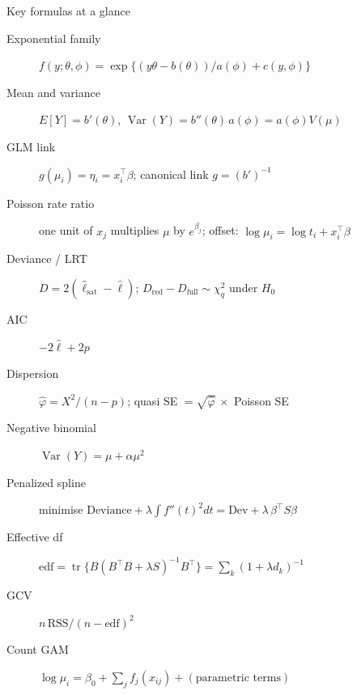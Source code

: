 \documentclass[aspectratio=169,11pt]{beamer}
\begin{document}
\begin{frame}{Key formulas at a glance}
  \footnotesize
  \begin{description}
    \item[Exponential family] $f(y;\theta,\phi) = \exp\{(y\theta - b(\theta))/a(\phi) + c(y,\phi)\}$
    \item[Mean and variance] $E[Y] = b'(\theta)$, \quad $\operatorname{Var}(Y) = b''(\theta)\,a(\phi) = a(\phi)V(\mu)$
    \item[GLM link] $g(\mu_i) = \eta_i = x_i^{\top}\beta$; canonical link $g = (b')^{-1}$
    \item[Poisson rate ratio] one unit of $x_j$ multiplies $\mu$ by $e^{\beta_j}$; offset: $\log\mu_i = \log t_i + x_i^{\top}\beta$
    \item[Deviance / LRT] $D = 2(\hat\ell_{\text{sat}} - \hat\ell)$; \quad $D_{\text{red}} - D_{\text{full}} \sim \chi^2_q$ under $H_0$
    \item[AIC] $-2\hat\ell + 2p$
    \item[Dispersion] $\hat\varphi = X^2/(n-p)$; quasi SE $= \sqrt{\hat\varphi}\,\times$ Poisson SE
    \item[Negative binomial] $\operatorname{Var}(Y) = \mu + \alpha\mu^2$
    \item[Penalized spline] minimise $\text{Deviance} + \lambda \int f''(t)^2 dt = \text{Dev} + \lambda\,\beta^{\top}S\beta$
    \item[Effective df] $\text{edf} = \operatorname{tr}\{B(B^{\top}B+\lambda S)^{-1}B^{\top}\} = \sum_k (1+\lambda d_k)^{-1}$
    \item[GCV] $n\,\text{RSS}/(n-\text{edf})^2$
    \item[Count GAM] $\log\mu_i = \beta_0 + \sum_j f_j(x_{ij}) + (\text{parametric terms})$
  \end{description}
\end{frame}
\end{document}
